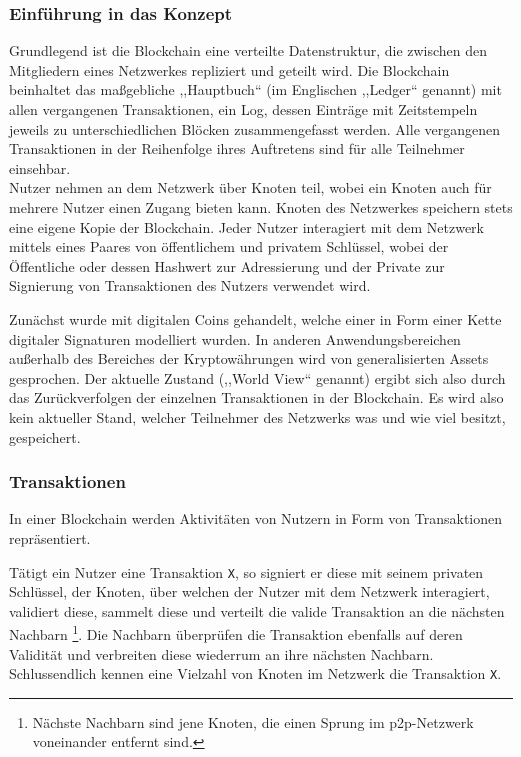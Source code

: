     \subsubsection{Einführung in das Konzept}
    \label{sec:sota_blockchain_introduction}
    Grundlegend ist die Blockchain eine verteilte Datenstruktur, die zwischen den Mitgliedern eines Netzwerkes repliziert und geteilt wird\cite{Christidis2016}.
    Die Blockchain beinhaltet das maßgebliche ,,Hauptbuch`` (im Englischen ,,Ledger`` genannt) mit allen vergangenen Transaktionen, ein Log, dessen Einträge mit Zeitstempeln jeweils zu unterschiedlichen Blöcken zusammengefasst werden. 
    Alle vergangenen Transaktionen in der Reihenfolge ihres Auftretens sind für alle Teilnehmer einsehbar\cite{Nakamoto2008}.
    \medskip\\
    Nutzer nehmen an dem Netzwerk über Knoten teil, wobei ein Knoten auch für mehrere Nutzer einen Zugang bieten kann. 
    Knoten des Netzwerkes speichern stets eine eigene Kopie der Blockchain.
    Jeder Nutzer interagiert mit dem Netzwerk mittels eines Paares von öffentlichem und privatem Schlüssel, wobei der Öffentliche oder dessen Hashwert zur Adressierung und der Private zur Signierung von Transaktionen des Nutzers verwendet wird.\cite{Christidis2016}
    
    Zunächst wurde mit digitalen Coins gehandelt, welche einer in Form einer Kette digitaler Signaturen modelliert wurden\cite{Nakamoto2008}.
    In anderen Anwendungsbereichen außerhalb des Bereiches der Kryptowährungen wird von generalisierten Assets gesprochen.
    Der aktuelle Zustand (,,World View`` genannt) ergibt sich also durch das Zurückverfolgen der einzelnen Transaktionen in der Blockchain. 
    Es wird also kein aktueller Stand, welcher Teilnehmer des Netzwerks was und wie viel besitzt, gespeichert.\cite{Christidis2016}
    
    \subsubsection{Transaktionen}
    \label{sec:sota_blockchain_trx}
    In einer Blockchain werden Aktivitäten von Nutzern in Form von Transaktionen repräsentiert. 
    
    Tätigt ein Nutzer eine Transaktion \lstinline{X}, so signiert er diese mit seinem privaten Schlüssel, der Knoten, über welchen der Nutzer mit dem Netzwerk interagiert, validiert diese, sammelt diese und verteilt die valide Transaktion an die nächsten Nachbarn
    \!\footnote{Nächste Nachbarn sind jene Knoten, die einen Sprung im \gls{p2p}-Netzwerk voneinander entfernt sind.}.
    Die Nachbarn überprüfen die Transaktion ebenfalls auf deren Validität und verbreiten diese wiederrum an ihre nächsten Nachbarn. 
    Schlussendlich kennen eine Vielzahl von Knoten im Netzwerk die Transaktion \lstinline{X}. 
    
